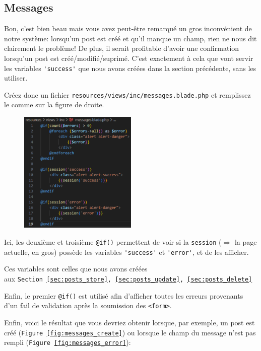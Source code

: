 \subsection{Messages}\label{sec:messages}
Bon, c'est bien beau mais vous avez peut-être remarqué un gros inconvénient de notre système: lorsqu'un post est créé et qu'il manque un champ, rien ne nous dit clairement le problème! De plus, il serait profitable d'avoir une confirmation lorsqu'un post est créé/modifié/suprimé. C'est exactement à cela que vont servir les variables \verb|'success'| que nous avons créées dans la section précédente, sans les utiliser.

Créez donc un fichier \verb|resources/views/inc/messages.blade.php| et remplissez le comme sur la figure de droite.

\begin{figure}
    \vspace{-0.5cm}
    \includegraphics[width=0.5\textwidth]{figures-C1/messages_blade.pdf}
\end{figure}
Ici, les deuxième et troisième \verb|@if()| permettent de voir si la \verb|session| ($\Rightarrow$ la page actuelle, en gros) possède les variables \verb|'success'| et \verb|'error'|, et de les afficher. 

Ces variables sont celles que nous avons créées \\ aux \texttt{Section~\ref{sec:posts_store},~\ref{sec:posts_update},~\ref{sec:posts_delete}}

Enfin, le premier \verb|@if()| est utilisé afin d'afficher toutes les erreurs provenants d'un fail de validation après la soumission des \verb|<form>|.

\vspace{4cm}

Enfin, voici le résultat que vous devriez obtenir lorsque, par exemple, un post est créé (\texttt{Figure~\ref{fig:messages_create}}) ou lorsque le champ du message n'est pas rempli (\texttt{Figure~\ref{fig:messages_error}}):

